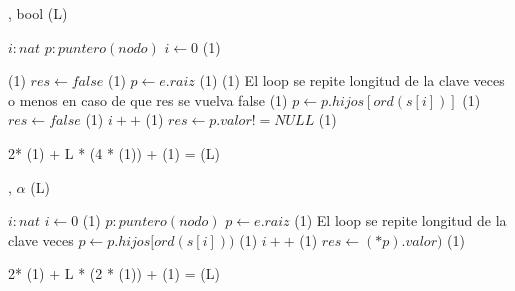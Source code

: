 {   ,
    }
    {bool}
    {\bigo(L)}
{
    \var $i : nat$
    \var $p : puntero(nodo)$
    \State $ i \gets 0$                                                 \comment \bigo(1)

                                                   \comment \bigo(1)
        \State $res \gets false$                                        \comment \bigo(1)
    \Else
        \State $ p \gets e.raiz$                                        \comment \bigo(1)
                              \comment \bigo(1)
            \Statex             \comment El loop se repite longitud de la clave veces o menos en caso de que res se vuelva false
                                       \comment \bigo(1)
                 \State $p \gets p.hijos[ord(s[i])]$                    \comment \bigo(1)
             \Else
                \State $res \gets false$                                \comment \bigo(1)
              \EndIf
             \State $i++$                                               \comment \bigo(1)
        \EndWhile
        \State $res \gets p.valor != NULL$                              \comment \bigo(1)
    \EndIf

}    {  2* \bigo(1) + L * (4 * \bigo(1)) + \bigo(1) = \bigo(L) }


{   ,
    }
    {$\alpha$}
    {\bigo(L)}
{
    \var $i : nat$
    \State $ i \gets 0$                                                 \comment \bigo(1)
    \var $p : puntero(nodo)$
    \State $ p \gets e.raiz$                                            \comment \bigo(1)
         \Statex             \comment El loop se repite longitud de la clave veces
         \State $p \gets p.hijos[ord(s[i]))$                            \comment \bigo(1)
         \State $i++$                                                   \comment \bigo(1)
    \EndWhile
    \State $res \gets (*p).valor)$                                      \comment \bigo(1)

}    {  2* \bigo(1) + L * (2 * \bigo(1)) + \bigo(1) = \bigo(L) }

